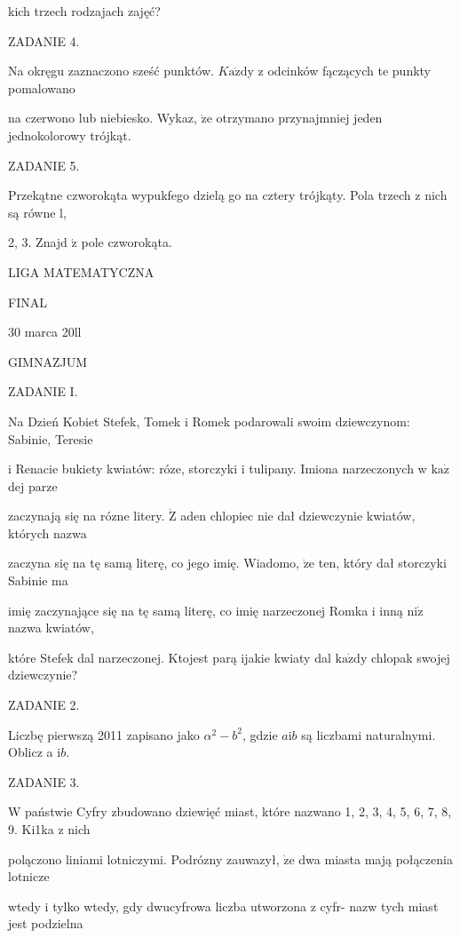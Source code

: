 \documentclass[a4paper,12pt]{article}
\begin{document}
kich trzech rodzajach zajęć?

ZADANIE 4.

Na okręgu zaznaczono sześć punktów. $K\mathrm{a}\dot{\mathrm{z}}\mathrm{d}\mathrm{y}$ z odcinków fączących te punkty pomalowano

na czerwono lub niebiesko. Wykaz, $\dot{\mathrm{z}}\mathrm{e}$ otrzymano przynajmniej jeden jednokolorowy trójkąt.

ZADANIE 5.

Przekątne czworokąta wypukfego dzielą go na cztery trójkąty. Pola trzech z nich są równe l,

2, 3. Znajd $\acute{\mathrm{z}}$ pole czworokąta.






LIGA MATEMATYCZNA

FINAL

30 marca 20ll

GIMNAZJUM

ZADANIE I.

Na Dzień Kobiet Stefek, Tomek i Romek podarowali swoim dziewczynom: Sabinie, Teresie

i Renacie bukiety kwiatów: róze, storczyki i tulipany. Imiona narzeczonych w $\mathrm{k}\mathrm{a}\dot{\mathrm{z}}$ dej parze

zaczynają się na rózne litery. $\dot{\mathrm{Z}}$ aden chlopiec nie dał dziewczynie kwiatów, których nazwa

zaczyna się na tę samą literę, co jego imię. Wiadomo, $\dot{\mathrm{z}}\mathrm{e}$ ten, który dał storczyki Sabinie ma

imię zaczynające się na tę samą literę, co imię narzeczonej Romka i inną $\mathrm{n}\mathrm{i}\dot{\mathrm{z}}$ nazwa kwiatów,

które Stefek dal narzeczonej. Ktojest parą ijakie kwiaty dal $\mathrm{k}\mathrm{a}\dot{\mathrm{z}}\mathrm{d}\mathrm{y}$ chlopak swojej dziewczynie?

ZADANIE 2.

Liczbę pierwszą 2011 zapisano jako $\alpha^{2}-b^{2}$, gdzie $a\mathrm{i}b$ są liczbami naturalnymi. Oblicz a $\mathrm{i}b.$

ZADANIE 3.

W państwie Cyfry zbudowano dziewięć miast, które nazwano 1, 2, 3, 4, 5, 6, 7, 8, 9. Ki1ka z nich

polączono liniami lotniczymi. Podrózny zauwazył, $\dot{\mathrm{z}}\mathrm{e}$ dwa miasta mają połączenia lotnicze

wtedy i tylko wtedy, gdy dwucyfrowa liczba utworzona z cyfr- nazw tych miast jest podzielna
\end{document}
